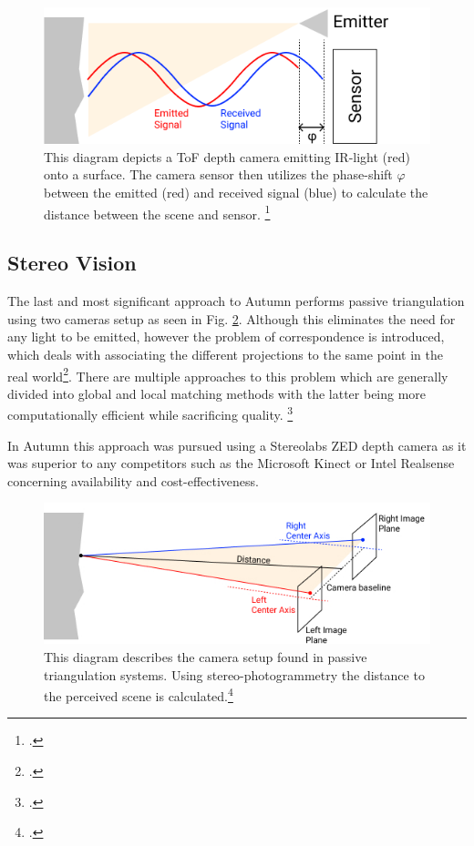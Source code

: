 \begin{figure}
	\centering
	\includegraphics[width=0.8\linewidth]{img/activeTriangulation}
	\caption{
		This diagram depicts a ToF depth camera emitting IR-light (red) onto a surface. The camera sensor then utilizes the phase-shift $\varphi$ between the emitted (red) and received signal (blue) to calculate the distance between the scene and sensor. \footcite{altuntas2021triangulation}
	}
	\label{fig:activeTriangulation}
\end{figure}


\subsection{Stereo Vision}
The last and most significant approach to Autumn performs passive triangulation using two cameras setup as seen in Fig. \ref{fig:passiveTriangulation}. Although this eliminates the need for any light to be emitted, however the problem of correspondence is introduced, which deals with associating the different projections to the same point in the real world\footcite{ng2019StereoCorrespondence}. There are multiple approaches to this problem which are generally divided into global and local matching methods with the latter being more computationally efficient while sacrificing quality. \footcite{do2019review}

In Autumn this approach was pursued using a Stereolabs ZED depth camera as it was superior to any competitors such as the Microsoft Kinect or Intel Realsense concerning availability and cost-effectiveness. 

\begin{figure}
	\centering
	\includegraphics[width=0.8\linewidth]{img/PassiveTriangulation}
	\caption{
		This diagram describes the camera setup found in passive triangulation systems. Using stereo-photogrammetry the distance to the perceived scene is calculated.\footcite{altuntas2021triangulation}
	}
	\label{fig:passiveTriangulation}
\end{figure}

